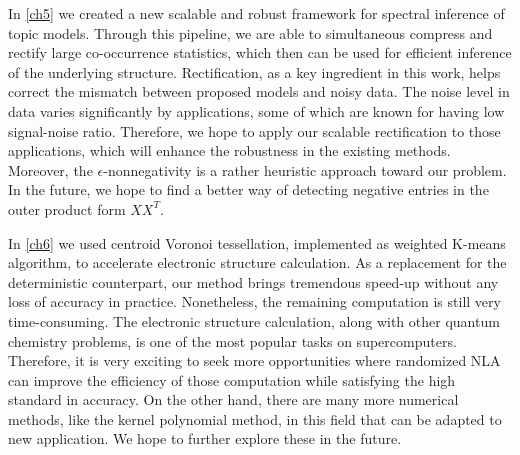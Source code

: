 In \cref{ch5} we created a new scalable and robust framework for spectral
inference of topic models. Through this pipeline, we are able to simultaneous
compress and rectify large co\hyp{}occurrence statistics, which then can be
used for efficient inference of the underlying structure. Rectification, as a
key ingredient in this work, helps correct the mismatch between proposed models
and noisy data. The noise level in data varies significantly by applications,
some of which are known for having low signal\hyp{}noise ratio. Therefore, we
hope to apply our scalable rectification to those applications, which will
enhance the robustness in the existing methods. Moreover, the 
$\epsilon$\hyp{}nonnegativity is a rather heuristic approach toward our problem.
In the future, we hope to find a better way of detecting negative entries in the
outer product form $XX^T$.


In \cref{ch6} we used centroid Voronoi tessellation, implemented as weighted 
K\hyp{}means algorithm, to accelerate electronic structure calculation. As a
replacement for the deterministic counterpart, our method brings tremendous
speed\hyp{}up without any loss of accuracy in practice. Nonetheless, the
remaining computation is still very time\hyp{}consuming. The electronic
structure calculation, along with other quantum chemistry problems, is one of
the most popular tasks on supercomputers. Therefore, it is very exciting to seek
more opportunities where randomized NLA can improve the efficiency of those
computation while satisfying the high standard in accuracy. On the other hand,
there are many more numerical methods, like the kernel polynomial method, in
this field that can be adapted to new application. We hope to further explore
these in the future.